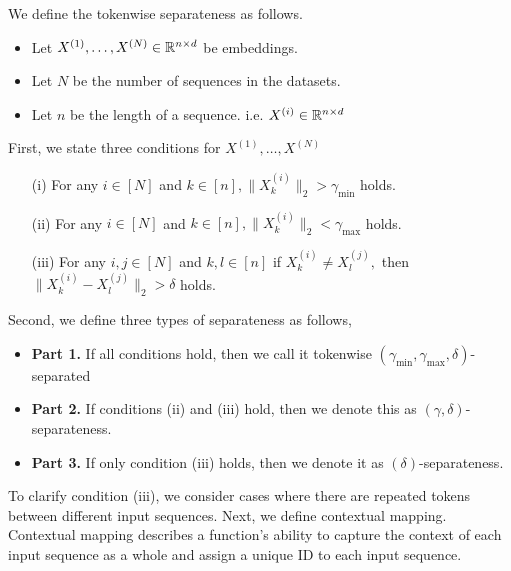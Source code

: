 \begin{definition} \label{def:token_seperate_new}
    We define the tokenwise separateness as follows.
    \begin{itemize}
        \item Let $X^{(1)}, \hdots, X^{(N)} \in \mathbb{R}^{n\times d}$ be embeddings. 
        \item Let $N$ be the number of sequences in the datasets.
        \item Let $n$ be the length of a sequence. i.e. $X^{(i)} \in \mathbb{R}^{n\times d}$
    \end{itemize}
    
    First, we state three conditions for $X^{(1)}, \hdots, X^{(N)}$ 
    \begin{itemize}
        \item [(i)] For any $i \in[N]$ and $k \in[n],\| X_k^{(i)}\|_2 > \gamma_{\min }$ holds. 
        \item [(ii)]
        For any $i \in[N]$ and $k \in[n], \|X_k^{(i)}\|_2<\gamma_{\max }$ holds.
        \item [(iii)]
        For any $i, j \in [N]$ and $k, l \in [n]$ if $X_k^{(i)} \neq X_ l^{(j)}, $ then $ \|X_k^{(i)}- X_l^{(j)}\|_2 > \delta$ holds.
    \end{itemize}
    Second, we define three types of separateness as follows, 
    \begin{itemize}
        \item {\bf Part 1.} If all conditions hold, then we call it  tokenwise $(\gamma_{\min }, \gamma_{\max }, \delta)$-separated
        \item {\bf Part 2.} If conditions (ii) and (iii) hold, then we denote this as $(\gamma, \delta)$-separateness.
        \item {\bf Part 3.} If only condition (iii) holds, then we denote it as $(\delta)$-separateness.
    \end{itemize} 
\end{definition}
To clarify condition (iii), we consider cases where there are repeated tokens between different input sequences. 
Next, we define contextual mapping. 
Contextual mapping describes a function's ability to capture the context of each input sequence as a whole and assign a unique ID to each input sequence.


